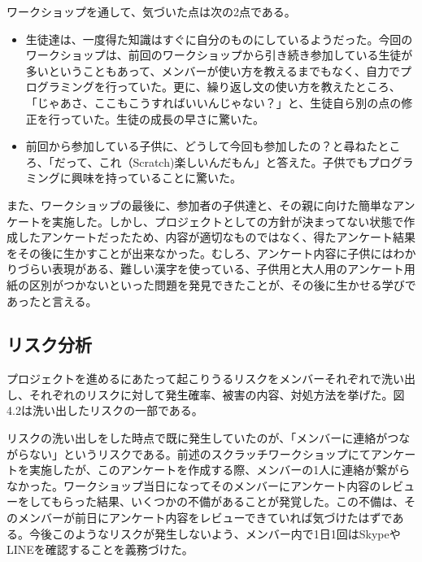\documentclass[openany,11pt,papersize]{jsbook}
\begin{document}
\par ワークショップを通して、気づいた点は次の2点である。
\begin{itemize}
\item 生徒達は、一度得た知識はすぐに自分のものにしているようだった。今回のワークショップは、前回のワークショップから引き続き参加している生徒が多いということもあって、メンバーが使い方を教えるまでもなく、自力でプログラミングを行っていた。更に、繰り返し文の使い方を教えたところ、「じゃあさ、ここもこうすればいいんじゃない？」と、生徒自ら別の点の修正を行っていた。生徒の成長の早さに驚いた。
\item 前回から参加している子供に、どうして今回も参加したの？と尋ねたところ、「だって、これ（Scratch)楽しいんだもん」と答えた。子供でもプログラミングに興味を持っていることに驚いた。
\end{itemize}

\par また、ワークショップの最後に、参加者の子供達と、その親に向けた簡単なアンケートを実施した。しかし、プロジェクトとしての方針が決まってない状態で作成したアンケートだったため、内容が適切なものではなく、得たアンケート結果をその後に生かすことが出来なかった。むしろ、アンケート内容に子供にはわかりづらい表現がある、難しい漢字を使っている、子供用と大人用のアンケート用紙の区別がつかないといった問題を発見できたことが、その後に生かせる学びであったと言える。


\subsection{リスク分析}
\par プロジェクトを進めるにあたって起こりうるリスクをメンバーそれぞれで洗い出し、それぞれのリスクに対して発生確率、被害の内容、対処方法を挙げた。図4.2は洗い出したリスクの一部である。

\par リスクの洗い出しをした時点で既に発生していたのが、「メンバーに連絡がつながらない」というリスクである。前述のスクラッチワークショップにてアンケートを実施したが、このアンケートを作成する際、メンバーの1人に連絡が繋がらなかった。ワークショップ当日になってそのメンバーにアンケート内容のレビューをしてもらった結果、いくつかの不備があることが発覚した。この不備は、そのメンバーが前日にアンケート内容をレビューできていれば気づけたはずである。今後このようなリスクが発生しないよう、メンバー内で1日1回はSkypeやLINEを確認することを義務づけた。
\end{document}
